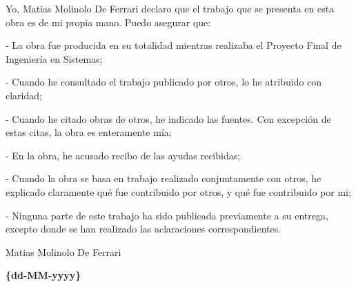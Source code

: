 \thispagestyle{empty}
\newpage
\vspace*{\fill}
        Yo, Matias Molinolo De Ferrari declaro que el trabajo que se presenta en esta obra es de mi%
        propia mano. Puedo asegurar que:
        
        - La obra fue producida en su totalidad mientras realizaba el Proyecto Final de Ingeniería en Sistemas;%
        
        - Cuando he consultado el trabajo publicado por otros, lo he atribuido con claridad;
        
        - Cuando he citado obras de otros, he indicado las fuentes. Con excepción de estas citas, la obra es enteramente mía;
        
        - En la obra, he acusado recibo de las ayudas recibidas;
        
        - Cuando la obra se basa en trabajo realizado conjuntamente con otros, he explicado claramente qué fue contribuido por otros, y qué fue contribuido por mi;
        
        - Ninguna parte de este trabajo ha sido publicada previamente a su entrega, excepto donde se han realizado las aclaraciones correspondientes.
\bigskip
\begin{center}
\bigskip\bigskip\bigskip\bigskip\bigskip\bigskip\bigskip\bigskip
Matias Molinolo De Ferrari
\end{center}


\vspace*{\fill}

\begin{center}
\textbf{\{dd-MM-yyyy\}}%
\end{center}
\newpage